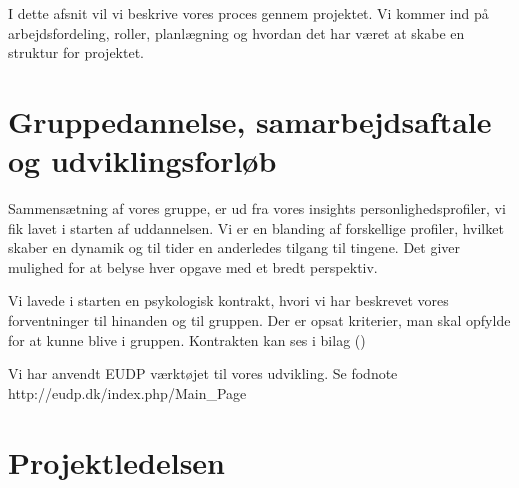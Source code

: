I dette afsnit vil vi beskrive vores proces gennem projektet. Vi kommer ind på arbejdsfordeling, roller, planlægning og hvordan det har været at skabe en struktur for projektet.

\section{Gruppedannelse, samarbejdsaftale og udviklingsforløb}
\label{sec:gruppe-dannelse:-}

Sammensætning af vores gruppe, er ud fra vores insights personlighedsprofiler, vi fik lavet i starten af uddannelsen. Vi er en blanding af forskellige profiler, hvilket skaber en dynamik og til tider en anderledes tilgang til tingene. Det giver mulighed for at belyse hver opgave med et bredt perspektiv.  


Vi lavede i starten en psykologisk kontrakt, hvori vi har beskrevet vores forventninger til hinanden og til gruppen. Der er opsat kriterier, man skal opfylde for at kunne blive i gruppen. %
Kontrakten kan ses i bilag ()


Vi har anvendt EUDP værktøjet til vores udvikling. Se fodnote http://eudp.dk/index.php/Main_Page

\section{Projektledelsen}
\label{sec:projektledelsen}

